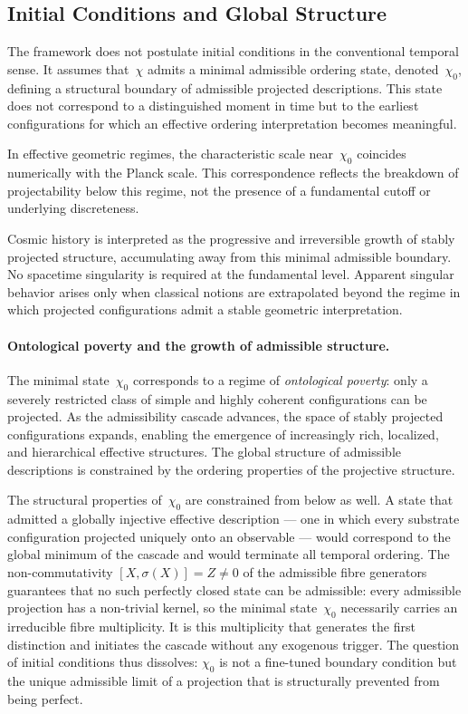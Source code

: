 \subsection{Initial Conditions and Global Structure}
  \label{subsec:initial-conditions-and-global-structure}

  The framework does not postulate initial conditions in the conventional
  temporal sense.
  It assumes that~$\chi$ admits a minimal admissible ordering state,
  denoted~$\chi_0$, defining a structural boundary of admissible projected
  descriptions.
  This state does not correspond to a distinguished moment in time but to the
  earliest configurations for which an effective ordering interpretation
  becomes meaningful.

  In effective geometric regimes, the characteristic scale near~$\chi_0$
  coincides numerically with the Planck scale.
  This correspondence reflects the breakdown of projectability below this
  regime, not the presence of a fundamental cutoff or underlying discreteness.

  Cosmic history is interpreted as the progressive and irreversible growth of
  stably projected structure, accumulating away from this minimal admissible
  boundary.
  No spacetime singularity is required at the fundamental level.
  Apparent singular behavior arises only when classical notions are
  extrapolated beyond the regime in which projected configurations admit a
  stable geometric interpretation.

  \paragraph{Ontological poverty and the growth of admissible structure.}
    The minimal state~$\chi_0$ corresponds to a regime of \emph{ontological
poverty}: only a severely restricted class of simple and highly coherent
    configurations can be projected.
    As the admissibility cascade advances, the space of stably projected
    configurations expands, enabling the emergence of increasingly rich,
    localized, and hierarchical effective structures.
    The global structure of admissible descriptions is constrained by the
    ordering properties of the projective structure.

    The structural properties of~$\chi_0$ are constrained from below as well.
    A state that admitted a globally injective effective description — one in
    which every substrate configuration projected uniquely onto an observable
    — would correspond to the global minimum of the cascade and would terminate
    all temporal ordering.
    The non-commutativity $[X,\sigma(X)] = Z \neq 0$ of the admissible fibre
    generators~\cite{Beau2026m} guarantees that no such perfectly closed
    state can be admissible: every admissible projection has a non-trivial
    kernel, so the minimal state~$\chi_0$ necessarily carries an irreducible
    fibre multiplicity.
    It is this multiplicity that generates the first distinction and initiates
    the cascade without any exogenous trigger.
    The question of initial conditions thus dissolves: $\chi_0$ is not a
    fine-tuned boundary condition but the unique admissible limit of a
    projection that is structurally prevented from being perfect.

